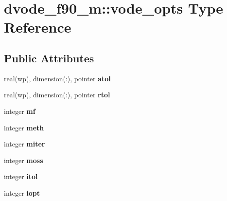 \hypertarget{structdvode__f90__m_1_1vode__opts}{}\section{dvode\+\_\+f90\+\_\+m\+:\+:vode\+\_\+opts Type Reference}
\label{structdvode__f90__m_1_1vode__opts}
\subsection*{Public Attributes}
\begin{DoxyCompactItemize}
\item 
\mbox{\label{structdvode__f90__m_1_1vode__opts_a441fd0e22ca6b6d21a97729ad9a006e5}} 
real(wp), dimension(\+:), pointer {\bfseries atol}
\item 
\mbox{\label{structdvode__f90__m_1_1vode__opts_a41cfac785194d7ebf491ea9aaa2193a7}} 
real(wp), dimension(\+:), pointer {\bfseries rtol}
\item 
\mbox{\label{structdvode__f90__m_1_1vode__opts_abb46eb3fb0d3394c1f70d8297af82ec2}} 
integer {\bfseries mf}
\item 
\mbox{\label{structdvode__f90__m_1_1vode__opts_a0a7b833f312a252c31c4e8c94cf41738}} 
integer {\bfseries meth}
\item 
\mbox{\label{structdvode__f90__m_1_1vode__opts_aa6792edff4f61182880433f6134387b5}} 
integer {\bfseries miter}
\item 
\mbox{\label{structdvode__f90__m_1_1vode__opts_a1bcf8e439ff3fed626461f98e0313d26}} 
integer {\bfseries moss}
\item 
\mbox{\label{structdvode__f90__m_1_1vode__opts_acc802e230e810bcac9b7e2291c8ba9e6}} 
integer {\bfseries itol}
\item 
\mbox{\label{structdvode__f90__m_1_1vode__opts_aa9a20a7537fed36f5d1cc6048515b9ef}} 
integer {\bfseries iopt}

\end{DoxyCompactItemize}
